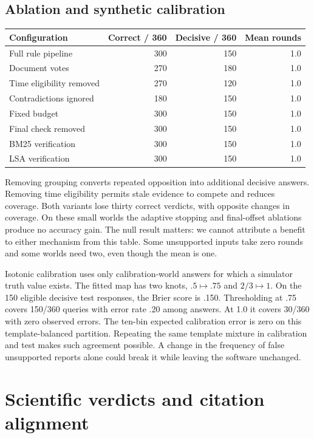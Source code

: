 \subsection{Ablation and synthetic calibration}
\begin{center}\small
\begin{tabular}{@{}lrrr@{}}\toprule
Configuration & Correct / 360 & Decisive / 360 & Mean rounds\\\midrule
Full rule pipeline & 300 & 150 & 1.0\\
Document votes & 270 & 180 & 1.0\\
Time eligibility removed & 270 & 120 & 1.0\\
Contradictions ignored & 180 & 150 & 1.0\\
Fixed budget & 300 & 150 & 1.0\\
Final check removed & 300 & 150 & 1.0\\
BM25 verification & 300 & 150 & 1.0\\
LSA verification & 300 & 150 & 1.0\\\bottomrule
\end{tabular}
\end{center}
Removing grouping converts repeated opposition into additional decisive answers. Removing time eligibility permits stale evidence to compete and reduces coverage. Both variants lose thirty correct verdicts, with opposite changes in coverage. On these small worlds the adaptive stopping and final-offset ablations produce no accuracy gain. The null result matters: we cannot attribute a benefit to either mechanism from this table. Some unsupported inputs take zero rounds and some worlds need two, even though the mean is one.

Isotonic calibration uses only calibration-world answers for which a simulator truth value exists. The fitted map has two knots, $.5\mapsto .75$ and $2/3\mapsto 1$. On the 150 eligible decisive test responses, the Brier score is .150. Thresholding at .75 covers 150/360 queries with error rate .20 among answers. At 1.0 it covers 30/360 with zero observed errors. The ten-bin expected calibration error is zero on this template-balanced partition. Repeating the same template mixture in calibration and test makes such agreement possible. A change in the frequency of false unsupported reports alone could break it while leaving the software unchanged.

\section{Scientific verdicts and citation alignment}
